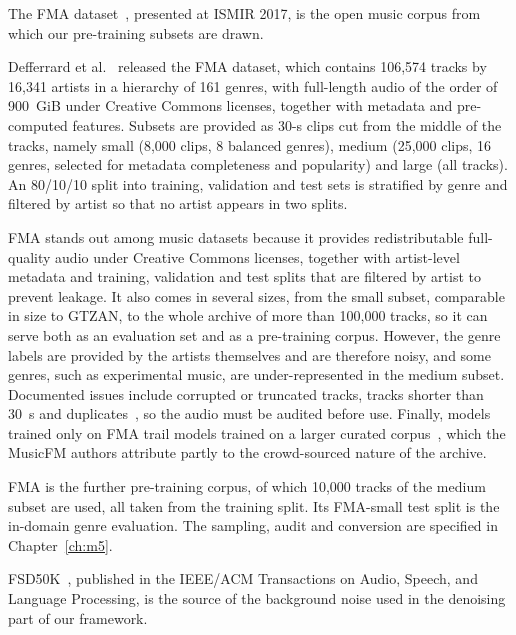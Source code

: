 \documentclass{FastFyp}
\begin{document}
The FMA dataset~\cite{ref:Defferrard:2017fma}, presented at ISMIR 2017, is the open music corpus from which our pre-training subsets are drawn.

\lrsummary
Defferrard et al.~\cite{ref:Defferrard:2017fma} released the FMA dataset, which contains 106,574 tracks by 16,341 artists in a hierarchy of 161 genres, with full-length audio of the order of 900~GiB under Creative Commons licenses, together with metadata and pre-computed features. Subsets are provided as 30-s clips cut from the middle of the tracks, namely small (8,000 clips, 8 balanced genres), medium (25,000 clips, 16 genres, selected for metadata completeness and popularity) and large (all tracks). An 80/10/10 split into training, validation and test sets is stratified by genre and filtered by artist so that no artist appears in two splits.

\lrcritical
FMA stands out among music datasets because it provides redistributable full-quality audio under Creative Commons licenses, together with artist-level metadata and training, validation and test splits that are filtered by artist to prevent leakage. It also comes in several sizes, from the small subset, comparable in size to GTZAN, to the whole archive of more than 100,000 tracks, so it can serve both as an evaluation set and as a pre-training corpus. However, the genre labels are provided by the artists themselves and are therefore noisy, and some genres, such as experimental music, are under-represented in the medium subset. Documented issues include corrupted or truncated tracks, tracks shorter than 30~s and duplicates~\cite{ref:FMAGit}, so the audio must be audited before use. Finally, models trained only on FMA trail models trained on a larger curated corpus~\cite{ref:Won:2024musicfm}, which the MusicFM authors attribute partly to the crowd-sourced nature of the archive.

\lrrelation
FMA is the further pre-training corpus, of which 10,000 tracks of the medium subset are used, all taken from the training split. Its FMA-small test split is the in-domain genre evaluation. The sampling, audit and conversion are specified in Chapter~\ref{ch:m5}.

FSD50K~\cite{ref:Fonseca:2022fsd50k}, published in the IEEE/ACM Transactions on Audio, Speech, and Language Processing, is the source of the background noise used in the denoising part of our framework.
\end{document}
